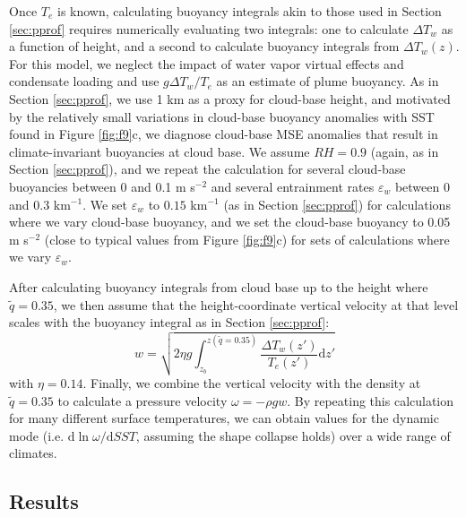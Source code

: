 \documentclass[twocol]{ametsoc}
\begin{document}
Once $T_e$ is known, calculating buoyancy integrals akin to those used in Section \ref{sec:pprof} requires numerically evaluating two integrals: one to calculate $\Delta T_w$ as a function of height, and a second to calculate buoyancy integrals from $\Delta T_w(z)$. For this model, we neglect the impact of water vapor virtual effects and condensate loading and use $g \Delta T_w / T_e$ as an estimate of plume buoyancy. As in Section \ref{sec:pprof}, we use 1 km as a proxy for cloud-base height, and motivated by the relatively small variations in cloud-base buoyancy anomalies with SST found in Figure \ref{fig:f9}c, we diagnose cloud-base MSE anomalies that result in climate-invariant buoyancies at cloud base. We assume $RH = 0.9$ (again, as in Section \ref{sec:pprof}), and we repeat the calculation for several cloud-base buoyancies between 0 and 0.1 m s$^{-2}$ and several entrainment rates $\varepsilon_w$ between $0$ and $0.3$ km$^{-1}$. We set $\varepsilon_w$ to $0.15$ km$^{-1}$ (as in Section \ref{sec:pprof}) for calculations where we vary cloud-base buoyancy, and we set the cloud-base buoyancy to 0.05 m s$^{-2}$ (close to typical values from Figure \ref{fig:f9}c) for sets of calculations where we vary $\varepsilon_w$.

After calculating buoyancy integrals from cloud base up to the height where $\tilde{q} = 0.35$, we then assume that the height-coordinate vertical velocity at that level scales with the buoyancy integral as in Section \ref{sec:pprof}:
\begin{equation}
    w = \sqrt{2 \eta g \int_{z_b}^{z(\tilde{q} = 0.35)} \frac{\Delta T_w(z')}{T_e(z')} \mathrm{d}{z'}}
\end{equation}
with $\eta = 0.14$. Finally, we combine the vertical velocity with the density at $\tilde{q} = 0.35$ to calculate a pressure velocity $\omega = -\rho g w$. By repeating this calculation for many different surface temperatures, we can obtain values for the dynamic mode (i.e. $\mathrm{d} \ln{\omega}/\mathrm{d}SST$, assuming the shape collapse holds) over a wide range of climates.

\subsection{Results}
\end{document}
